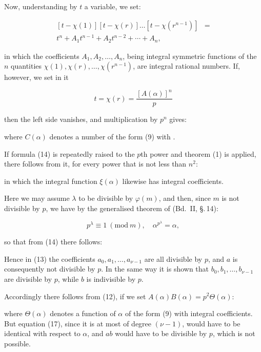 Now, understanding by $t$ a variable, we set:

\[
\begin{aligned}
{}[t - \chi(1)][t - \chi(r)] \ldots [t - \chi(r^{n-1})] &= \\
t^n + A_1t^{n-1} + A_2t^{n-2} + \cdots + A_n, &
\end{aligned}
\]

in which the coefficients $A_1, A_2, \ldots, A_n$, being integral symmetric functions of the $n$ quantities $\chi(1), \chi(r), \ldots, \chi(r^{n-1})$, are integral rational numbers. If, however, we set in it

\[
t = \chi(r) = \dfrac{[A(\alpha)]^n}{p}
\]

then the left side vanishes, and multiplication by $p^n$ gives:


where $C(\alpha)$ denotes a number of the form (9) with .

If formula (14) is repeatedly raised to the $p$th power and theorem (1) is applied, there follows from it, for every power that is not less than $n^2$:


in which the integral function $\xi(\alpha)$ likewise has integral coefficients.

Here we may assume $\lambda$ to be divisible by $\varphi(m)$, and then, since $m$ is not divisible by $p$, we have by the generalised theorem of  (Bd.~II, \S.\,14):

\[
p^\lambda \equiv 1 \ (\mathrm{mod}\ m), \quad \alpha^{p^\lambda} = \alpha,
\]

so that from (14) there follows: %


Hence in (13) the coefficients $a_0, a_1, \ldots, a_{\nu-1}$ are all divisible by $p$, and $a$ is consequently not divisible by $p$. In the same way it is shown that $b_0, b_1, \ldots, b_{\nu-1}$ are divisible by $p$, while $b$ is indivisible by $p$.

Accordingly there follows from (12), if we set $A(\alpha)B(\alpha) = p^2\Theta(\alpha)$:


where $\Theta(\alpha)$ denotes a function of $\alpha$ of the form (9) with integral coefficients. But equation (17), since it is at most of degree $(\nu-1)$, would have to be identical with respect to $\alpha$, and $ab$ would have to be divisible by $p$, which is not possible.
